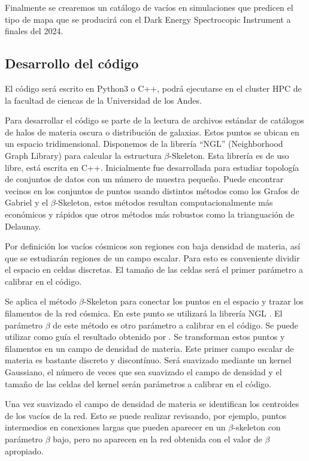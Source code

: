 \documentclass[preprint]{aastex62}
\begin{document}
  Finalmente se crearemos un cat\'alogo de vac\'ios en simulaciones
  que predicen el tipo de mapa que se producir\'a con el Dark Energy
  Spectrocopic Instrument a finales del 2024. 

  \subsection{Desarrollo del código}

  El código será escrito en Python3 o C++, podrá ejecutarse en el
  cluster HPC de la facultad de ciencas de la Universidad de los Andes.
  
  Para desarrollar el código se parte de la lectura de archivos estándar de catálogos de halos
  de materia oscura o distribución de galaxias. Estos puntos se ubican en un espacio tridimensional.
  Disponemos de la librería ``NGL''\citep{ngl} (Neighborhood Graph Library)
  para calcular la estructura $\beta$-Skeleton. Esta librería es de uso libre, está escrita en C++.
  Inicialmente fue desarrollada para estudiar topología de conjuntos de datos con un número de muestra
  pequeño. Puede encontrar vecinos en los conjuntos de puntos usando distintos métodos como los
  Grafos de Gabriel y el $\beta$-Skeleton, estos métodos resultan computacionalmente más económicos
  y rápidos que otros métodos más robustos como la trianguación de Delaunay.
  
  Por definición los vacíos cósmicos son regiones con baja densidad de materia, así que se
  estudiarán regiones de un campo escalar. Para esto es conveniente dividir el espacio en
  celdas discretas. El tamaño de las celdas será el primer parámetro a calibrar en el código.
  
  Se aplica el método $\beta$-Skeleton para conectar los puntos en el espacio y trazar los
  filamentos de la red cósmica. En este punto se utilizará la librería NGL \citep{ngl}.
  El parámetro $\beta$ de este método es otro parámetro a calibrar en el código. Se puede
  utilizar como guía el resultado obtenido por \citet{Fang2018}.
  Se transforman estos puntos y filamentos en un campo de densidad de materia. Este primer
  campo escalar de materia es bastante discreto y discontínuo. Será suavizado mediante un
  kernel Gaussiano, el número de veces que sea suavizado el campo de densidad y el tamaño de
  las celdas del kernel serán parámetros a calibrar en el código.

  Una vez suavizado el campo de densidad de materia se identifican los centroides
  de los vacíos de la red. Esto se puede realizar revisando, por ejemplo, puntos intermedios
  en conexiones largas que pueden aparecer en un $\beta$-skeleton con parámetro $\beta$ bajo,
  pero no aparecen en la red obtenida con el valor de $\beta$ apropiado.
\end{document}
